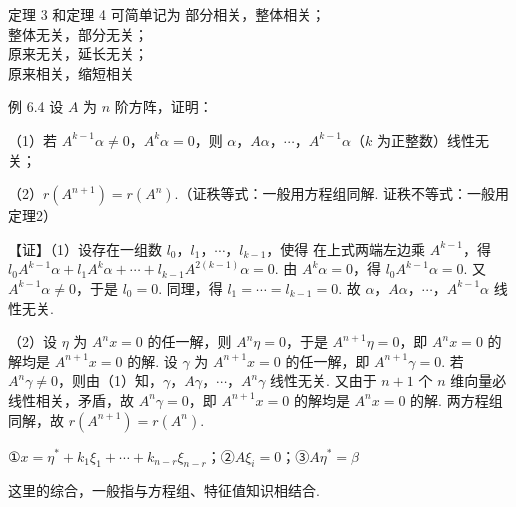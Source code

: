 \begin{fkey}{定理 3 和定理 4 可简单记为}
部分相关，整体相关；\\
整体无关，部分无关；\\
原来无关，延长无关；\\
原来相关，缩短相关
\end{fkey}

\begin{fcard}{例 6.4}
设 $A$ 为 $n$ 阶方阵，证明：

（1）若 $A^{k-1}\alpha\ne0$，$A^k\alpha=0$，则 $\alpha$，$A\alpha$，$\cdots$，$A^{k-1}\alpha$（$k$ 为正整数）线性无关；

（2）$r(A^{n+1})=r(A^n)$.（证秩等式：一般用方程组同解. 证秩不等式：一般用定理2）

【证】（1）设存在一组数 $l_0$，$l_1$，$\cdots$，$l_{k-1}$，使得
在上式两端左边乘 $A^{k-1}$，得 $l_0A^{k-1}\alpha+l_1A^k\alpha+\cdots+l_{k-1}A^{2(k-1)}\alpha=0$. 由 $A^k\alpha=0$，得 $l_0A^{k-1}\alpha=0$. 又 $A^{k-1}\alpha\ne0$，于是 $l_0=0$. 同理，得 $l_1=\cdots=l_{k-1}=0$. 故 $\alpha$，$A\alpha$，$\cdots$，$A^{k-1}\alpha$ 线性无关.


（2）设 $\eta$ 为 $A^n x=0$ 的任一解，则 $A^n\eta=0$，于是 $A^{n+1}\eta=0$，即 $A^n x=0$ 的解均是 $A^{n+1}x=0$ 的解. 设 $\gamma$ 为 $A^{n+1}x=0$ 的任一解，即 $A^{n+1}\gamma=0$. 若 $A^n\gamma\ne0$，则由（1）知，$\gamma$，$A\gamma$，$\cdots$，$A^n\gamma$ 线性无关. 又由于 $n+1$ 个 $n$ 维向量必线性相关，矛盾，故 $A^n\gamma=0$，即 $A^{n+1}x=0$ 的解均是 $A^n x=0$ 的解. 两方程组同解，故 $r(A^{n+1})=r(A^n)$.
\end{fcard}



①$x=\eta^{*}+k_1\xi_1+\cdots+k_{n-r}\xi_{n-r}$；②$A\xi_i=0$；③$A\eta^{*}=\beta$

这里的综合，一般指与方程组、特征值知识相结合.

